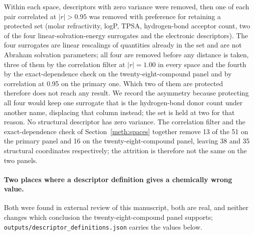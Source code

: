 \documentclass[11pt,a4paper]{article}
\begin{document}
Within each space, descriptors with zero variance were removed, then one of each
pair correlated at $|r|>0.95$ was removed with preference for retaining a
protected set (molar refractivity, logP, TPSA, hydrogen-bond acceptor count, two
of the four linear-solvation-energy surrogates and the electronic descriptors).
The four surrogates are linear rescalings of quantities already in the set and
are not Abraham solvation parameters; all four are removed before any
distance is taken, three of them by the correlation filter at $|r| = 1.00$ in
every space and the fourth by the exact-dependence check on the
twenty-eight-compound panel and by correlation at 0.95 on the primary one.
Which two of them are protected therefore does not reach any result. We record
the asymmetry because protecting all four would keep one surrogate that is the
hydrogen-bond donor count under another name, displacing that column instead;
the set is held at two for that reason. No structural descriptor has zero
variance. The correlation filter and the exact-dependence check of
Section~\ref{meth:spaces} together remove 13 of the 51 on the primary panel and
16 on the twenty-eight-compound panel, leaving 38 and 35 structural coordinates
respectively; the attrition is therefore not the same on the two panels.

\paragraph{Two places where a descriptor definition gives a chemically wrong
value.} Both were found in external review of this manuscript, both are real,
and neither changes which conclusion the twenty-eight-compound panel supports;
\texttt{outputs/descriptor\_definitions.json} carries the values below.
\end{document}
